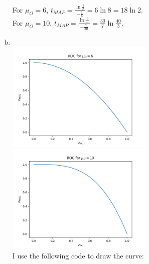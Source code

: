 \begin{pr}
\begin{enumerate}[(a)]
For $\mu_O=6$, $t_{MAP}=\frac{\ln\frac18}{-\frac16}=6\ln8=18\ln2$.\\
For $\mu_O=10$, $t_{MAP}=\frac{\ln\frac3{40}}{-\frac7{30}}=\frac{30}7\ln\frac{40}3$.
\item$ $\\
\includegraphics[width=7cm]{muO6.png}
\includegraphics[width=7cm]{muO10.png}\\
I use the following code to draw the curve:

\end{enumerate}
\end{pr}
